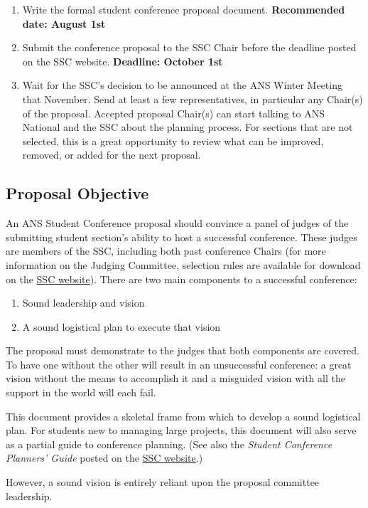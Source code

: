 \documentclass[12pt]{article}
\begin{document}
\begin{enumerate}
\item{Write the formal student conference proposal document. \textbf{Recommended date: August 1st}}
\item{Submit the conference proposal to the SSC Chair before the deadline posted on the SSC website. \textbf{Deadline: October 1st}}
\item{Wait for the SSC’s decision to be announced at the ANS Winter Meeting that November. Send at least a few representatives, in particular any Chair(s) of the proposal. Accepted proposal Chair(s) can start talking to ANS National and the SSC about the planning process. For sections that are not selected, this is a great opportunity to review what can be improved, removed, or added for the next proposal.}
\end{enumerate}

\subsection{Proposal Objective}
An ANS Student Conference proposal should convince a panel of judges of the submitting student section’s ability to host a successful conference. These judges are members of the SSC, including both past conference Chairs (for more information on the Judging Committee, selection rules are available for download on the \href{http://students.ans.org/student-conferences/}{SSC website}).
There are two main
components to a successful conference:
\begin{enumerate}
\item{Sound leadership and vision}
\item{A sound logistical plan to execute that vision}
\end{enumerate}

The proposal must demonstrate to the judges that both components are covered.
To have one without the other will result in an unsuccessful conference: a great vision without the means to accomplish it and a misguided vision with all the support in the world will each fail.

This document provides a skeletal frame from which to develop a sound logistical plan. For students new to managing large projects, this document will also serve as a partial guide to conference planning. (See also the \textit{Student Conference Planners’ Guide} posted on the \href{http://students.ans.org/student-conferences/}{SSC website}.)

However, a sound vision is entirely reliant upon the proposal committee leadership.
\end{document}
